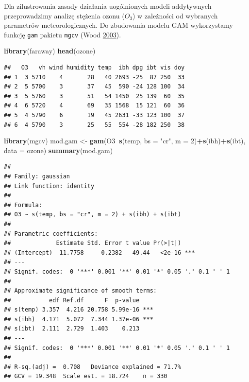 \documentclass[]{book}
\newenvironment{Shaded}{\begin{snugshade}}{\end{snugshade}}
\newcommand{\DataTypeTok}[1]{\textcolor[rgb]{0.13,0.29,0.53}{#1}}
\newcommand{\DecValTok}[1]{\textcolor[rgb]{0.00,0.00,0.81}{#1}}
\newcommand{\KeywordTok}[1]{\textcolor[rgb]{0.13,0.29,0.53}{\textbf{#1}}}
\newcommand{\NormalTok}[1]{#1}
\newcommand{\OperatorTok}[1]{\textcolor[rgb]{0.81,0.36,0.00}{\textbf{#1}}}
\newcommand{\StringTok}[1]{\textcolor[rgb]{0.31,0.60,0.02}{#1}}
\theoremstyle{plain}
\theoremstyle{definition}
\theoremstyle{definition}
\theoremstyle{definition}
\theoremstyle{definition}
\theoremstyle{remark}
\let\BeginKnitrBlock\begin \let\EndKnitrBlock\end
\begin{document}
\BeginKnitrBlock{example}
\protect\hypertarget{exm:gam}{}{\label{exm:gam} }Dla zilustrowania zasady działania uogólnionych modeli addytywnych przeprowadzimy analizę stężenia ozonu (\(O_3\)) w zależności od wybranych parametrów meteorologicznych. Do zbudowania modelu GAM wykorzystamy funkcję \texttt{gam} pakietu \texttt{mgcv} (Wood \protect\hyperlink{ref-R-mgcv}{2003}).
\EndKnitrBlock{example}

\begin{Shaded}
\begin{Highlighting}[]
\KeywordTok{library}\NormalTok{(faraway)}
\KeywordTok{head}\NormalTok{(ozone)}
\end{Highlighting}
\end{Shaded}

\begin{verbatim}
##   O3   vh wind humidity temp  ibh dpg ibt vis doy
## 1  3 5710    4       28   40 2693 -25  87 250  33
## 2  5 5700    3       37   45  590 -24 128 100  34
## 3  5 5760    3       51   54 1450  25 139  60  35
## 4  6 5720    4       69   35 1568  15 121  60  36
## 5  4 5790    6       19   45 2631 -33 123 100  37
## 6  4 5790    3       25   55  554 -28 182 250  38
\end{verbatim}

\begin{Shaded}
\begin{Highlighting}[]
\KeywordTok{library}\NormalTok{(mgcv)}
\NormalTok{mod.gam <-}\StringTok{ }\KeywordTok{gam}\NormalTok{(O3}\OperatorTok{~}\KeywordTok{s}\NormalTok{(temp, }\DataTypeTok{bs =} \StringTok{"cr"}\NormalTok{, }\DataTypeTok{m =} \DecValTok{2}\NormalTok{)}\OperatorTok{+}\KeywordTok{s}\NormalTok{(ibh)}\OperatorTok{+}\KeywordTok{s}\NormalTok{(ibt), }\DataTypeTok{data =}\NormalTok{ ozone)}
\KeywordTok{summary}\NormalTok{(mod.gam)}
\end{Highlighting}
\end{Shaded}

\begin{verbatim}
## 
## Family: gaussian 
## Link function: identity 
## 
## Formula:
## O3 ~ s(temp, bs = "cr", m = 2) + s(ibh) + s(ibt)
## 
## Parametric coefficients:
##             Estimate Std. Error t value Pr(>|t|)    
## (Intercept)  11.7758     0.2382   49.44   <2e-16 ***
## ---
## Signif. codes:  0 '***' 0.001 '**' 0.01 '*' 0.05 '.' 0.1 ' ' 1
## 
## Approximate significance of smooth terms:
##           edf Ref.df      F  p-value    
## s(temp) 3.357  4.216 20.758 5.99e-16 ***
## s(ibh)  4.171  5.072  7.344 1.37e-06 ***
## s(ibt)  2.111  2.729  1.403    0.213    
## ---
## Signif. codes:  0 '***' 0.001 '**' 0.01 '*' 0.05 '.' 0.1 ' ' 1
## 
## R-sq.(adj) =  0.708   Deviance explained = 71.7%
## GCV = 19.348  Scale est. = 18.724    n = 330
\end{verbatim}
\end{document}
